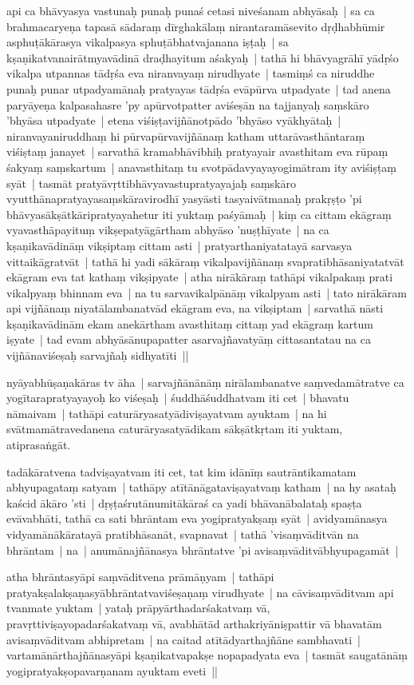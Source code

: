 \documentclass[article,12pt,a4paper]{memoir}
\begin{document}
	  \pstart api ca bhāvyasya vastunaḥ punaḥ punaś cetasi niveśanam abhyāsaḥ | sa ca brahmacaryeṇa tapasā sādaraṃ dīrghakālaṃ nirantaramāsevito dṛḍhabhūmir asphuṭākārasya vikalpasya sphuṭābhatvajanana iṣṭaḥ | sa kṣaṇikatvanairātmyavādinā draḍhayitum aśakyaḥ | tathā hi bhāvyagrāhī yādṛśo vikalpa utpannas tādṛśa eva niranvayaṃ nirudhyate | tasmiṃś ca niruddhe punaḥ punar utpadyamānaḥ pratyayas tādṛśa evāpūrva utpadyate | tad anena paryāyeṇa kalpasahasre 'py apūrvotpatter aviśeṣān na tajjanyaḥ saṃskāro 'bhyāsa utpadyate | etena viśiṣṭavijñānotpādo 'bhyāso vyākhyātaḥ | niranvayaniruddhaṃ hi pūrvapūrvavijñānaṃ katham uttarāvasthāntaraṃ viśiṣtaṃ janayet | sarvathā kramabhāvibhiḥ pratyayair avasthitam eva rūpaṃ śakyaṃ saṃskartum | anavasthitaṃ tu svotpādavyayayogimātram ity aviśiṣṭaṃ syāt | tasmāt pratyāvṛttibhāvyavastupratyayajaḥ saṃskāro vyutthānapratyayasaṃskāravirodhī yasyāsti tasyaivātmanaḥ prakṛṣṭo 'pi bhāvyasākṣātkāripratyayahetur iti yuktaṃ paśyāmaḥ | kiṃ ca cittam ekāgraṃ vyavasthāpayituṃ vikṣepatyāgārtham abhyāso 'nuṣṭhīyate | na ca kṣaṇikavādināṃ vikṣiptaṃ cittam asti | pratyarthaniyatatayā sarvasya vittaikāgratvāt | tathā hi yadi sākāraṃ vikalpavijñānaṃ svapratibhāsaniyatatvāt ekāgram eva tat kathaṃ vikṣipyate | atha nirākāraṃ tathāpi vikalpakaṃ prati vikalpyaṃ bhinnam eva | na tu sarvavikalpānāṃ vikalpyam asti | tato nirākāram api vijñānaṃ niyatālambanatvād ekāgram eva, na vikṣiptam | sarvathā nāsti kṣaṇikavādinām ekam anekārtham avasthitaṃ cittaṃ yad ekāgraṃ kartum iṣyate | tad evam abhyāsānupapatter asarvajñavatyāṃ cittasantatau na ca vijñānaviśeṣaḥ sarvajñaḥ sidhyatīti || 
	\pend
      

	  \pstart nyāyabhūṣaṇakāras tv āha | sarvajñānānāṃ nirālambanatve saṃvedamātratve ca yogītarapratyayayoḥ ko viśeṣaḥ | śuddhāśuddhatvam iti cet | bhavatu nāmaivam | tathāpi caturāryasatyādiviṣayatvam ayuktam | na hi svātmamātravedanena caturāryasatyādikam sākṣātkṛtam iti yuktam, atiprasaṅgāt. 
	\pend
      

	  \pstart tadākāratvena tadviṣayatvam iti cet, tat kim idānīṃ sautrāntikamatam abhyupagataṃ satyam | tathāpy atītānāgataviṣayatvaṃ katham | na hy asataḥ kaścid ākāro 'sti | dṛṣṭaśrutānumitākāraś ca yadi bhāvanābalataḥ spaṣṭa evāvabhāti, tathā ca sati bhrāntam eva yogipratyakṣaṃ syāt | avidyamānasya vidyamānākāratayā pratibhāsanāt, svapnavat | tathā 'visaṃvāditvān na bhrāntam | na | anumānajñānasya bhrāntatve 'pi avisaṃvāditvābhyupagamāt | 
	\pend
      

	  \pstart atha bhrāntasyāpi saṃvāditvena prāmāṇyam | tathāpi pratyakṣalakṣaṇasyābhrāntatvaviśeṣaṇaṃ virudhyate | na cāvisaṃvāditvam api tvanmate yuktam | yataḥ prāpyārthadarśakatvaṃ vā, pravṛttiviṣayopadarśakatvaṃ vā, avabhātād arthakriyāniṣpattir vā bhavatām avisaṃvāditvam abhipretam | na caitad atītādyarthajñāne sambhavati | vartamānārthajñānasyāpi kṣaṇikatvapakṣe nopapadyata eva | tasmāt saugatānāṃ yogipratyakṣopavarṇanam ayuktam eveti || 
	\pend
      
\end{document}
